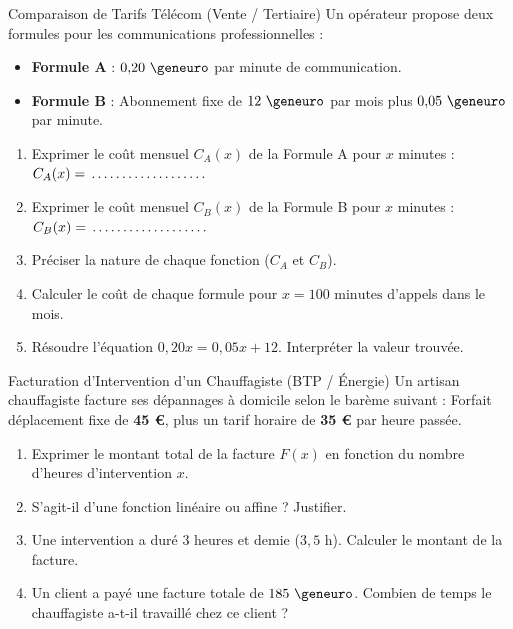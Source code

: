\begin{exercice}[4 pts]{\capAnalyser}{Comparaison de Tarifs Télécom (Vente / Tertiaire)}
Un opérateur propose deux formules pour les communications professionnelles :
\begin{itemize}[leftmargin=1.5em, itemsep=1pt]
    \item \textbf{Formule A} : $0{,}20\text{ \euro{}}$ par minute de communication.
    \item \textbf{Formule B} : Abonnement fixe de $12\text{ \euro{}}$ par mois plus $0{,}05\text{ \euro{}}$ par minute.
\end{itemize}

\begin{enumerate}[leftmargin=1.5em]
    \item Exprimer le coût mensuel $C_A(x)$ de la Formule A pour $x$ minutes : $C_A(x) = \pointille[3cm]$
    \item Exprimer le coût mensuel $C_B(x)$ de la Formule B pour $x$ minutes : $C_B(x) = \pointille[3cm]$
    \item Préciser la nature de chaque fonction ($C_A$ et $C_B$).
    \item Calculer le coût de chaque formule pour $x = 100\text{ minutes}$ d'appels dans le mois.
    \item Résoudre l'équation $0{,}20x = 0{,}05x + 12$. Interpréter la valeur trouvée.
\end{enumerate}
\lignesreponse[4]
\end{exercice}

\begin{exercice}[4 pts]{\capAnalyser}{Facturation d'Intervention d'un Chauffagiste (BTP / Énergie)}
Un artisan chauffagiste facture ses dépannages à domicile selon le barème suivant :
Forfait déplacement fixe de \textbf{45 \euro{}}, plus un tarif horaire de \textbf{35 \euro{}} par heure passée.

\begin{enumerate}[leftmargin=1.5em]
    \item Exprimer le montant total de la facture $F(x)$ en fonction du nombre d'heures d'intervention $x$.
    \item S'agit-il d'une fonction linéaire ou affine ? Justifier.
    \item Une intervention a duré $3\text{ heures et demie}$ ($3{,}5\text{ h}$). Calculer le montant de la facture.
    \item Un client a payé une facture totale de $185\text{ \euro{}}$. Combien de temps le chauffagiste a-t-il travaillé chez ce client ?
\end{enumerate}
\lignesreponse[4]
\end{exercice}

